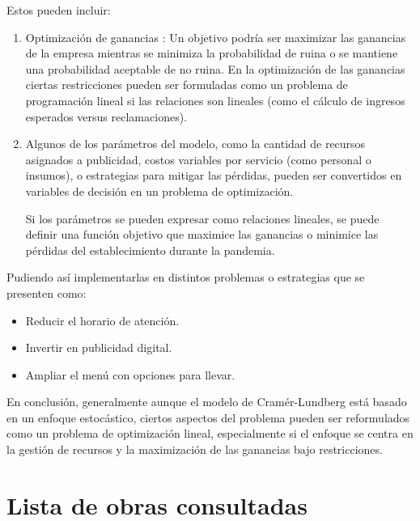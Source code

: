 \documentclass[
  us-letterpaper,
]{scrreprt}
\theoremstyle{plain}
\theoremstyle{plain}
\theoremstyle{definition}
\theoremstyle{remark}
\begin{document}
Estos pueden incluir:

\begin{enumerate}
\def\labelenumi{\arabic{enumi}.}
\item
  Optimización de ganancias : Un objetivo podría ser maximizar las
  ganancias de la empresa mientras se minimiza la probabilidad de ruina
  o se mantiene una probabilidad aceptable de no ruina. En la
  optimización de las ganancias ciertas restricciones pueden ser
  formuladas como un problema de programación lineal si las relaciones
  son lineales (como el cálculo de ingresos esperados versus
  reclamaciones).
\item
  Algunos de los parámetros del modelo, como la cantidad de recursos
  asignados a publicidad, costos variables por servicio (como personal o
  insumos), o estrategias para mitigar las pérdidas, pueden ser
  convertidos en variables de decisión en un problema de optimización.

  Si los parámetros se pueden expresar como relaciones lineales, se
  puede definir una función objetivo que maximice las ganancias o
  minimice las pérdidas del establecimiento durante la pandemia.
\end{enumerate}

Pudiendo así implementarlas en distintos problemas o estrategias que se
presenten como:

\begin{itemize}
\item
  Reducir el horario de atención.
\item
  Invertir en publicidad digital.
\item
  Ampliar el menú con opciones para llevar.
\end{itemize}

En conclusión, generalmente aunque el modelo de Cramér-Lundberg está
basado en un enfoque estocástico, ciertos aspectos del problema pueden
ser reformulados como un problema de optimización lineal, especialmente
si el enfoque se centra en la gestión de recursos y la maximización de
las ganancias bajo restricciones.


\chapter*{Lista de obras consultadas}\label{lista-de-obras-consultadas}


\printbibliography[heading=none]
\end{document}
